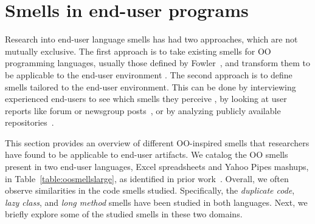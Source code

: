 \documentclass{sig-alternate}
\begin{document}
\section{Smells in end-user programs}
\label{sec:smells}
Research into end-user language smells has had two approaches, which are not mutually exclusive.
The first approach is to take existing smells for OO programming languages, usually those defined by Fowler~\cite{Fowl1999}, and transform them to be applicable to the end-user environment \cite{Hermans2012inter,Hermans2012intra,Stolee2011,StoleeTSE2013, chambers2013smell}.
The second approach is to define smells tailored to the end-user environment.
This can be done by interviewing experienced end-users to see which smells they perceive \cite{chambers2013smell}, by looking at user reports like forum or newsgroup posts~\cite{badame2012refactoring,chambers2013smell}, or by analyzing publicly available repositories~\cite{Stolee2011,StoleeTSE2013,Hermans2012intra}.


This section provides an overview of different OO-inspired smells that researchers have found to be applicable to end-user artifacts. 
 We catalog the OO smells present in two end-user languages, Excel spreadsheets and Yahoo Pipes mashups, in Table~\ref{table:oosmellslarge}, as identified in prior work~\cite{Stolee2011,StoleeTSE2013,Hermans2012intra, Hermans2012inter}.
 Overall, we often observe similarities in the code smells studied. Specifically, the \emph{duplicate code}, \emph{lazy class}, and \emph{long method} smells  have been studied in both languages. 
Next, we briefly explore some of the studied smells in these two domains. 
\end{document}
